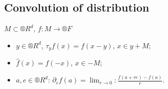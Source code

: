 \documentclass[12pt]{article}					%
\begin{document}
\subsection{Convolution of distribution}
\begin{definice}
	$M \subset ®R^d$, $f: M \rightarrow ®F$
	\begin{itemize}
		\item $y \in ®R^d$, $τ_y f(x) = f(x - y)$, $x \in y + M$;
		\item $\hat{f}(x) = f(-x)$, $x \in -M$;
		\item $a, e \in ®R^d$: $\partial_e f(a) = \lim_{r \rightarrow 0}: \frac{f(a + re) - f(a)}{r}$.
	\end{itemize}
\end{definice}
\end{document}
